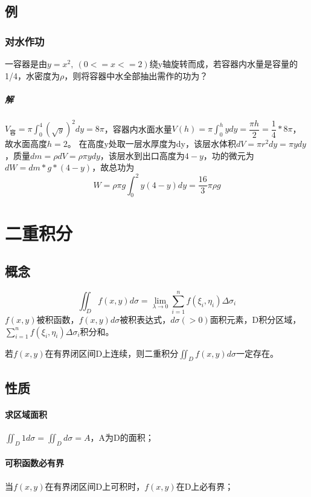 \subsection{例}

\subsubsection{对水作功}
一容器是由\(y = x^2,\ (0 <= x <= 2)\)绕y轴旋转而成，若容器内水量是容量的1/4，水密度为\(\rho\)，则将容器中水全部抽出需作的功为？
\subparagraph{解}
\(V_{\text{容}} = \pi\displaystyle\int_0^4(\sqrt{y})^2dy = 8\pi\)，容器内水面水量\(V(h) = \pi\displaystyle\int_0^hydy = \dfrac{\pi h}{2} = \dfrac{1}{4} * 8\pi\)，故水面高度\(h = 2\)。
在高度y处取一层水厚度为dy，该层水体积\(dV = \pi r^2dy = \pi ydy\)，质量\(dm = \rho dV = \rho\pi ydy\)，该层水到出口高度为\(4 - y\)，功的微元为\(dW = dm * g * (4 - y)\)，故总功为\[W = \rho\pi g\int_0^2y(4 - y)dy = \dfrac{16}{3}\pi\rho g\]



\section{二重积分}

\subsection{概念}
\[\iint_Df(x, y)d\sigma = \lim_{\lambda \to 0}\sum_{i = 1}^nf(\xi_i, \eta_i)\Delta\sigma_i\]
\(f(x, y)\)被积函数，\(f(x, y)d\sigma\)被积表达式，\(d\sigma( > 0)\)面积元素，D积分区域，\(\displaystyle\sum_{i = 1}^nf(\xi_i, \eta_i)\Delta\sigma_i\)积分和。

若\(f(x, y)\)在有界闭区间D上连续，则二重积分\(\displaystyle\iint_Df(x, y)d\sigma\)一定存在。


\subsection{性质}

\paragraph{求区域面积}
\(\displaystyle\iint_D1d\sigma = \iint_Dd\sigma = A\)，A为D的面积；

\paragraph{可积函数必有界}
当\(f(x, y)\)在有界闭区间D上可积时，\(f(x, y)\)在D上必有界；

